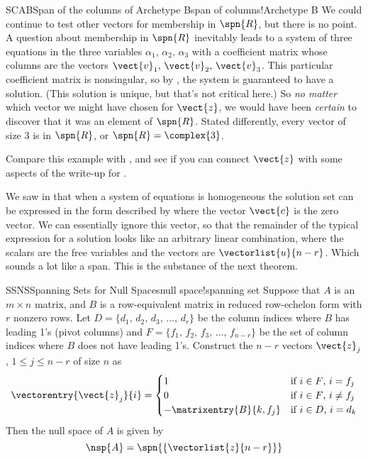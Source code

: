 \begin{example}{SCAB}{Span of the columns of Archetype B}{span of columns!Archetype B}
We could continue to test other vectors for membership in $\spn{R}$, but there is no point.   A question about membership in $\spn{R}$ inevitably leads to a system of three equations in the three variables $\alpha_1,\,\alpha_2,\,\alpha_3$ with a coefficient matrix whose columns are the vectors $\vect{v}_1,\,\vect{v}_2,\,\vect{v}_3$.  This particular coefficient matrix is nonsingular, so by , the system is guaranteed to have a solution.  (This solution is unique, but that's not critical here.)  So {\em no matter} which vector we might have chosen for $\vect{z}$, we would have been {\em certain} to discover that it was an element of $\spn{R}$.  Stated differently, every vector of size 3 is in $\spn{R}$, or $\spn{R}=\complex{3}$.\par
%
Compare this example with , and see if you can connect $\vect{z}$ with some aspects of the write-up for .
%
\end{example}
%
%
%
%
We saw in  that when a system of equations is homogeneous the solution set can be expressed in the form described by  where the vector $\vect{c}$ is the zero vector.  We can essentially ignore this vector, so that the remainder of the typical expression for a solution looks like an arbitrary linear combination, where the scalars are the free variables and the vectors are $\vectorlist{u}{n-r}$.  Which sounds a lot like a span.  This is the substance of the next theorem.
%
\begin{theorem}{SSNS}{Spanning Sets for Null Spaces}{null space!spanning set}
Suppose that $A$ is an $m\times n$ matrix, and $B$ is a row-equivalent matrix in reduced row-echelon form with $r$ nonzero rows.  Let $D=\{d_1,\,d_2,\,d_3,\,\ldots,\,d_r\}$ be the column indices where $B$ has leading 1's (pivot columns) and $F=\{f_1,\,f_2,\,f_3,\,\ldots,\,f_{n-r}\}$ be the set of column indices where $B$ does not have leading 1's.  Construct the $n-r$ vectors $\vect{z}_j$, $1\leq j\leq n-r$ of size $n$ as
%
\begin{equation*}
\vectorentry{\vect{z}_j}{i}=
\begin{cases}
1&\text{if $i\in F$, $i=f_j$}\\
0&\text{if $i\in F$, $i\neq f_j$}\\
-\matrixentry{B}{k,f_j}&\text{if $i\in D$, $i=d_k$}
\end{cases}
\end{equation*}
%
Then the null space of $A$ is given by
%
\begin{equation*}
\nsp{A}=\spn{\left\{\vectorlist{z}{n-r}\right\}}
\end{equation*}
%
\end{theorem}

